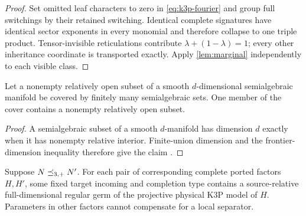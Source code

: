 \begin{proof}
Set omitted leaf characters to zero in \eqref{eq:k3p-fourier} and group full
switchings by their retained switching.  Identical complete signatures have
identical sector exponents in every monomial and therefore collapse to one
triple product.  Tensor-invisible reticulations contribute
\(\lambda+(1-\lambda)=1\); every other inheritance coordinate is transported
exactly.  Apply \cref{lem:marginal} independently to each visible class.
\end{proof}

\begin{lemma}\label{lem:finite-cover}
Let a nonempty relatively open subset of a smooth \(d\)-dimensional
semialgebraic manifold be covered by finitely many semialgebraic sets.  One
member of the cover contains a nonempty relatively open subset.
\end{lemma}

\begin{proof}
A semialgebraic subset of a smooth \(d\)-manifold has dimension \(d\)
exactly when it has nonempty relative interior.  Finite-union dimension and
the frontier-dimension inequality therefore give the claim
\cite[Propositions~2.8.5(i) and~2.8.13]{BochnakCosteRoy1998}.
\end{proof}

\begin{proposition}
\label{prop:localization}
Suppose \(N\preceq_{3,+} N'\).  For each pair of corresponding complete ported
factors \(H,H'\), some fixed target incoming and completion type contains a
source-relative full-dimensional regular germ of the projective physical K3P
model of \(H\).  Parameters in other factors cannot compensate for a local
separator.
\end{proposition}

